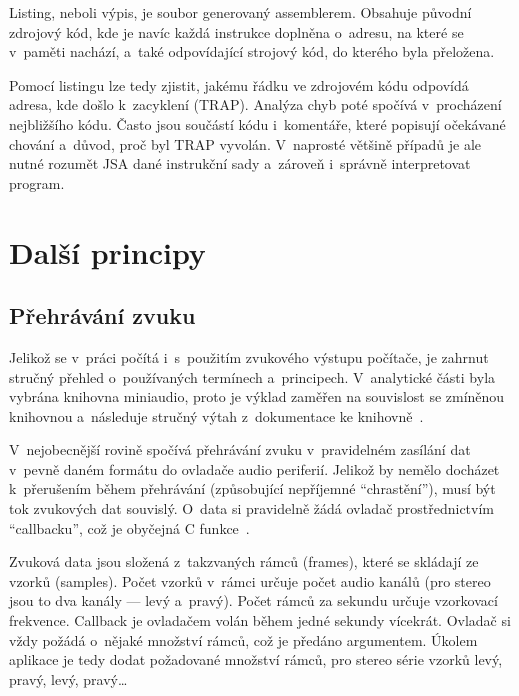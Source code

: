 \begin{definition}[Listing]
	Listing, neboli výpis, je soubor generovaný assemblerem. Obsahuje původní zdrojový kód, kde je navíc každá instrukce doplněna o~adresu, na které se v~paměti nachází, a~také odpovídající strojový kód, do kterého byla přeložena.~
\end{definition}

Pomocí listingu lze tedy zjistit, jakému řádku ve zdrojovém kódu odpovídá adresa, kde došlo k~zacyklení (TRAP). Analýza chyb poté spočívá v~procházení nejbližšího kódu. Často jsou součástí kódu i~komentáře, které popisují očekávané chování a~důvod, proč byl TRAP vyvolán. V~naprosté většině případů je ale nutné rozumět JSA dané instrukční sady a~zároveň i~správně interpretovat program.

\section{Další principy}
\subsection{Přehrávání zvuku}
\label{sec:zpracovani-zvuku}
Jelikož se v~práci počítá i~s~použitím zvukového výstupu počítače, je zahrnut stručný přehled o~používaných termínech a~principech. V~analytické části byla vybrána knihovna miniaudio, proto je výklad zaměřen na souvislost se zmíněnou knihovnou a~následuje stručný výtah z~dokumentace ke knihovně~\cite{Reid2023:miniaudio}.

V~nejobecnější rovině spočívá přehrávání zvuku v~pravidelném zasílání dat v~pevně daném formátu do ovladače audio periferií. Jelikož by nemělo docházet k~přerušením během přehrávání (způsobující nepříjemné \enquote{chrastění}), musí být tok zvukových dat souvislý. O~data si pravidelně žádá ovladač prostřednictvím \enquote{callbacku}, což je obyčejná C funkce~\cite{Reid2023:miniaudio}.

Zvuková data jsou složená z~takzvaných rámců (frames), které se skládají ze vzorků (samples). Počet vzorků v~rámci určuje počet audio kanálů (pro stereo jsou to dva kanály --- levý a~pravý). Počet rámců za sekundu určuje vzorkovací frekvence. Callback je ovladačem volán během jedné sekundy vícekrát. Ovladač si vždy požádá o~nějaké množství rámců, což je předáno argumentem. Úkolem aplikace je tedy dodat požadované množství rámců, pro stereo série vzorků levý, pravý, levý, pravý\dots~\cite{Reid2023:miniaudio}

